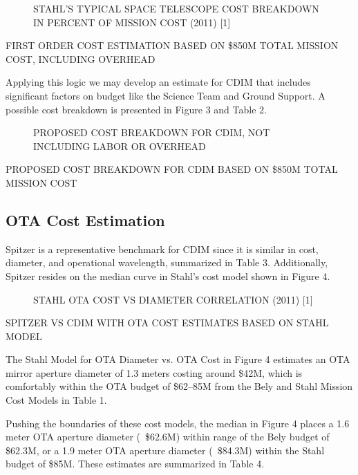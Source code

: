 \documentclass{ws-jai}
\newenvironment{notes}{\color{red}}{}
\begin{document}
\begin{notes}
\begin{figure}
  \caption{STAHL'S TYPICAL SPACE TELESCOPE COST BREAKDOWN IN PERCENT OF MISSION COST (2011) [1]
\label{fig:stahl-mission-cost}
}
\end{figure}

\begin{table}
  \caption{FIRST ORDER COST ESTIMATION BASED ON \$850M TOTAL MISSION COST, INCLUDING OVERHEAD
\label{tab:first-order-cost-estimate}
}
\end{table}

Applying this logic we may develop an estimate for CDIM that includes significant factors on budget like the Science Team and Ground Support.
A possible cost breakdown is presented in Figure 3 and Table 2.

\begin{figure}
  \caption{PROPOSED COST BREAKDOWN FOR CDIM, NOT INCLUDING LABOR OR OVERHEAD
\label{fig:cost-no-overhead}
}
\end{figure}

\begin{table}
  \caption{PROPOSED COST BREAKDOWN FOR CDIM BASED ON \$850M TOTAL MISSION COST
\label{tab:cost-from-total-mission}
}
\end{table}

\subsection{OTA Cost Estimation}
Spitzer is a representative benchmark for CDIM since it is similar in cost, diameter, and operational wavelength, summarized in Table 3.
Additionally, Spitzer resides on the median curve in Stahl's cost model shown in Figure 4.

\begin{figure}
  \caption{STAHL OTA COST VS DIAMETER CORRELATION (2011) [1]
\label{fig:cost-stahl-ota-cost-vs-diameter}
}
\end{figure}

\begin{table}
  \caption{SPITZER VS CDIM WITH OTA COST ESTIMATES BASED ON STAHL MODEL
\label{tab:cost-spitzer-vs-CDIM}
}
\end{table}

The Stahl Model for OTA Diameter vs. OTA Cost in Figure 4 estimates an OTA mirror aperture diameter of 1.3 meters costing around \$42M, which is comfortably within the OTA budget of \$62--85M from the Bely and Stahl Mission Cost Models in Table 1.

Pushing the boundaries of these cost models, the median in Figure 4 places a 1.6 meter OTA aperture diameter (~\$62.6M) within range of the Bely budget of \$62.3M, or a 1.9 meter OTA aperture diameter (~\$84.3M) within the Stahl budget of \$85M.
These estimates are summarized in Table 4.


\end{notes}
\end{document}
